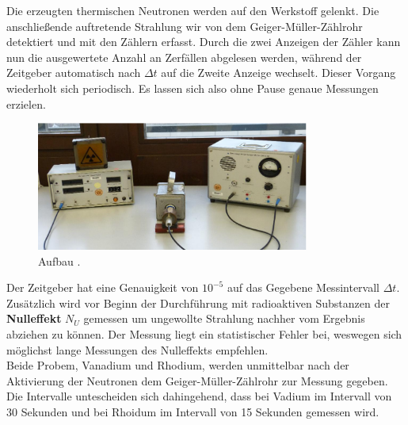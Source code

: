 Die erzeugten thermischen Neutronen %
werden auf den Werkstoff gelenkt. Die anschließende auftretende Strahlung wir von dem Geiger-Müller-Zählrohr detektiert und mit den Zählern erfasst.
Durch die zwei Anzeigen der Zähler kann nun die ausgewertete Anzahl an Zerfällen abgelesen werden, während der Zeitgeber automatisch nach $\Delta t$ auf die Zweite Anzeige wechselt.
Dieser Vorgang wiederholt sich periodisch. Es lassen sich also ohne Pause genaue Messungen erzielen.

\begin{figure}
  \centering
  \includegraphics[width=0.8\textwidth]{bilder/Screenshot 2021-01-22 103203.png}
  \caption{Aufbau  \cite{hinweis}.}
  \label{fig:aufbau}
\end{figure}
Der Zeitgeber hat eine Genauigkeit von $10^{-5}$ auf das Gegebene Messintervall $\Delta t$.
Zusätzlich wird vor Beginn der Durchführung mit radioaktiven Substanzen der \textbf{Nulleffekt} $N_U$ %
gemessen um ungewollte Strahlung nachher vom Ergebnis abziehen zu können.  Der Messung liegt ein statistischer Fehler bei, weswegen sich möglichst lange Messungen des Nulleffekts empfehlen.
\\
\newline
Beide Probem, Vanadium und Rhodium, werden unmittelbar nach der Aktivierung der Neutronen dem Geiger-Müller-Zählrohr zur Messung gegeben.
Die Intervalle untescheiden sich dahingehend, dass bei Vadium im Intervall von 30 Sekunden und bei Rhoidum im Intervall von 15 Sekunden gemessen wird.


